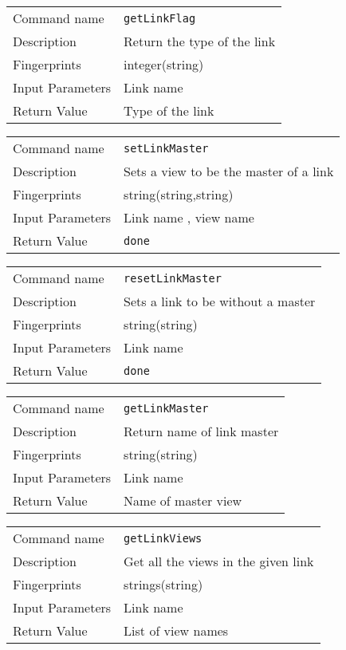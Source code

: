 \noindent
\begin{tabular}{l|p{5in}}
\hline
Command name &{\tt getLinkFlag }\\ 
Description &
 Return the type of the link 
 	\\
Fingerprints & integer(string)\\
Input Parameters& Link name \\
Return Value& Type of the link \\
\hline
\end{tabular}
\bigskip

\noindent
\begin{tabular}{l|p{5in}}
\hline
Command name &{\tt setLinkMaster }\\ 
Description &
 Sets a view to be the master of a link 
 	\\
Fingerprints & string(string,string)\\
Input Parameters& Link name , view name \\
Return Value&{\tt done}\\
\hline
\end{tabular}
\bigskip

\noindent
\begin{tabular}{l|p{5in}}
\hline
Command name &{\tt resetLinkMaster }\\ 
Description &
 Sets a link to be without a master 
 	\\
Fingerprints & string(string)\\
Input Parameters& Link name \\
Return Value&{\tt done}\\
\hline
\end{tabular}
\bigskip

\noindent
\begin{tabular}{l|p{5in}}
\hline
Command name &{\tt getLinkMaster }\\ 
Description &
 Return name of link master 
 	\\
Fingerprints & string(string)\\
Input Parameters& Link name \\
Return Value& Name of master view \\
\hline
\end{tabular}
\bigskip

\noindent
\begin{tabular}{l|p{5in}}
\hline
Command name &{\tt getLinkViews }\\ 
Description &
 Get all the views in the given link 
 	\\
Fingerprints & strings(string)\\
Input Parameters& Link name \\
Return Value& List of view names \\
\hline
\end{tabular}
\bigskip

